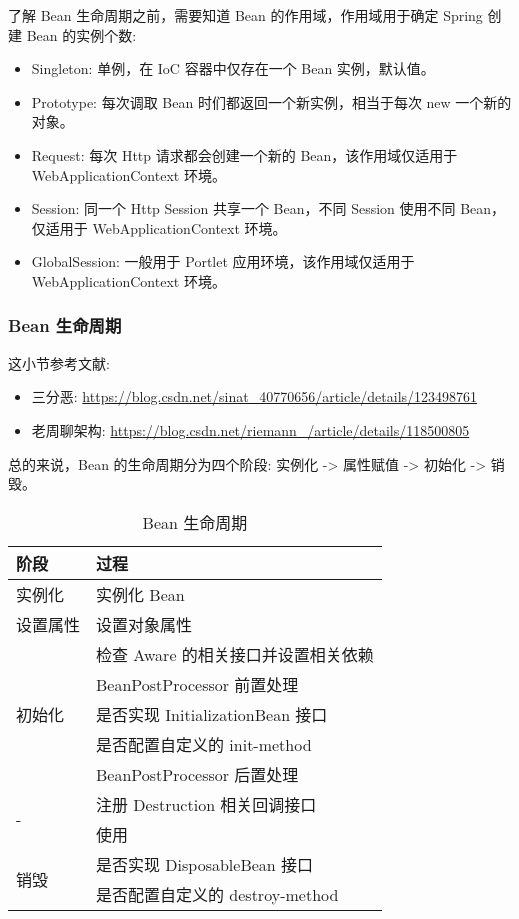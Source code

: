 了解 Bean 生命周期之前，需要知道 Bean 的作用域，作用域用于确定 Spring 创建 Bean 的实例个数:
\begin{itemize}
    \item Singleton: 单例，在 IoC 容器中仅存在一个 Bean 实例，默认值。
    \item Prototype: 每次调取 Bean 时们都返回一个新实例，相当于每次 new 一个新的对象。
    \item Request: 每次 Http 请求都会创建一个新的 Bean，该作用域仅适用于 WebApplicationContext 环境。
    \item Session: 同一个 Http Session 共享一个 Bean，不同 Session 使用不同 Bean，仅适用于 WebApplicationContext 环境。
    \item GlobalSession: 一般用于 Portlet 应用环境，该作用域仅适用于 WebApplicationContext 环境。
\end{itemize}

\subsubsection{Bean 生命周期}

这小节参考文献:
\begin{itemize}
    \item 三分恶: \url{https://blog.csdn.net/sinat_40770656/article/details/123498761}
    \item 老周聊架构: \url{https://blog.csdn.net/riemann_/article/details/118500805}
\end{itemize}

总的来说，Bean 的生命周期分为四个阶段: 实例化 -> 属性赋值 -> 初始化 -> 销毁。

\begin{table}[H]
    \small
    \centering
    \caption{Bean 生命周期}
    \label{table:Bean 生命周期}
    \setlength{\tabcolsep}{4mm}
    \begin{tabular}{l|l}
        \toprule
        \textbf{阶段} & \textbf{过程} \\
        \midrule
        实例化 & 实例化 Bean \\
        \midrule
        设置属性 & 设置对象属性 \\
        \midrule
        \multirow{5}{*}{初始化} & 检查 Aware 的相关接口并设置相关依赖 \\
         & BeanPostProcessor 前置处理 \\
         & 是否实现 InitializationBean 接口 \\
         & 是否配置自定义的 init-method \\
         & BeanPostProcessor 后置处理 \\
        \midrule
        \multirow{2}{*}{-} & 注册 Destruction 相关回调接口 \\
         & 使用 \\
        \midrule
        \multirow{2}{*}{销毁} & 是否实现 DisposableBean 接口 \\
         & 是否配置自定义的 destroy-method \\
        \bottomrule
    \end{tabular}
\end{table}



